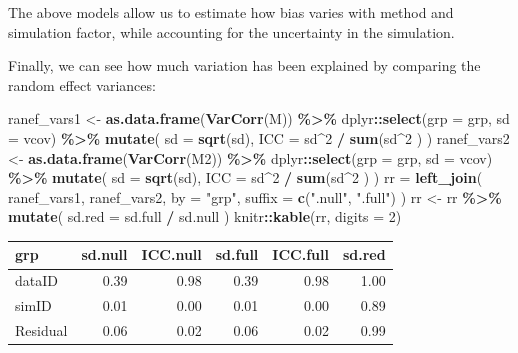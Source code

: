 \documentclass[
]{book}
\newenvironment{Shaded}{\begin{snugshade}}{\end{snugshade}}
\newcommand{\AttributeTok}[1]{\textcolor[rgb]{0.13,0.29,0.53}{#1}}
\newcommand{\DecValTok}[1]{\textcolor[rgb]{0.00,0.00,0.81}{#1}}
\newcommand{\FunctionTok}[1]{\textcolor[rgb]{0.13,0.29,0.53}{\textbf{#1}}}
\newcommand{\NormalTok}[1]{#1}
\newcommand{\OtherTok}[1]{\textcolor[rgb]{0.56,0.35,0.01}{#1}}
\newcommand{\SpecialCharTok}[1]{\textcolor[rgb]{0.81,0.36,0.00}{\textbf{#1}}}
\newcommand{\StringTok}[1]{\textcolor[rgb]{0.31,0.60,0.02}{#1}}
\begin{document}
The above models allow us to estimate how bias varies with method and simulation factor, while accounting for the uncertainty in the simulation.

Finally, we can see how much variation has been explained by comparing the random effect variances:

\begin{Shaded}
\begin{Highlighting}[]
\NormalTok{ranef\_vars1 }\OtherTok{\textless{}{-}}
  \FunctionTok{as.data.frame}\NormalTok{(}\FunctionTok{VarCorr}\NormalTok{(M)) }\SpecialCharTok{\%\textgreater{}\%}
\NormalTok{  dplyr}\SpecialCharTok{::}\FunctionTok{select}\NormalTok{(}\AttributeTok{grp =}\NormalTok{ grp, }\AttributeTok{sd =}\NormalTok{ vcov) }\SpecialCharTok{\%\textgreater{}\%}
  \FunctionTok{mutate}\NormalTok{( }\AttributeTok{sd =} \FunctionTok{sqrt}\NormalTok{(sd),}
          \AttributeTok{ICC =}\NormalTok{ sd}\SpecialCharTok{\^{}}\DecValTok{2} \SpecialCharTok{/} \FunctionTok{sum}\NormalTok{(sd}\SpecialCharTok{\^{}}\DecValTok{2}\NormalTok{ ) )}
\NormalTok{ranef\_vars2 }\OtherTok{\textless{}{-}}
  \FunctionTok{as.data.frame}\NormalTok{(}\FunctionTok{VarCorr}\NormalTok{(M2)) }\SpecialCharTok{\%\textgreater{}\%}
\NormalTok{  dplyr}\SpecialCharTok{::}\FunctionTok{select}\NormalTok{(}\AttributeTok{grp =}\NormalTok{ grp, }\AttributeTok{sd =}\NormalTok{ vcov) }\SpecialCharTok{\%\textgreater{}\%}
  \FunctionTok{mutate}\NormalTok{( }\AttributeTok{sd =} \FunctionTok{sqrt}\NormalTok{(sd),}
          \AttributeTok{ICC =}\NormalTok{ sd}\SpecialCharTok{\^{}}\DecValTok{2} \SpecialCharTok{/} \FunctionTok{sum}\NormalTok{(sd}\SpecialCharTok{\^{}}\DecValTok{2}\NormalTok{ ) )}
\NormalTok{rr }\OtherTok{=} \FunctionTok{left\_join}\NormalTok{( ranef\_vars1, ranef\_vars2, }\AttributeTok{by =} \StringTok{"grp"}\NormalTok{, }
                \AttributeTok{suffix =} \FunctionTok{c}\NormalTok{(}\StringTok{".null"}\NormalTok{, }\StringTok{".full"}\NormalTok{) )}
\NormalTok{rr }\OtherTok{\textless{}{-}}\NormalTok{ rr }\SpecialCharTok{\%\textgreater{}\%}
  \FunctionTok{mutate}\NormalTok{( }\AttributeTok{sd.red =}\NormalTok{ sd.full }\SpecialCharTok{/}\NormalTok{ sd.null )}
\NormalTok{knitr}\SpecialCharTok{::}\FunctionTok{kable}\NormalTok{(rr, }\AttributeTok{digits =} \DecValTok{2}\NormalTok{)}
\end{Highlighting}
\end{Shaded}

\begin{tabular}{l|r|r|r|r|r}
\hline
grp & sd.null & ICC.null & sd.full & ICC.full & sd.red\\
\hline
dataID & 0.39 & 0.98 & 0.39 & 0.98 & 1.00\\
\hline
simID & 0.01 & 0.00 & 0.01 & 0.00 & 0.89\\
\hline
Residual & 0.06 & 0.02 & 0.06 & 0.02 & 0.99\\
\hline
\end{tabular}
\end{document}
